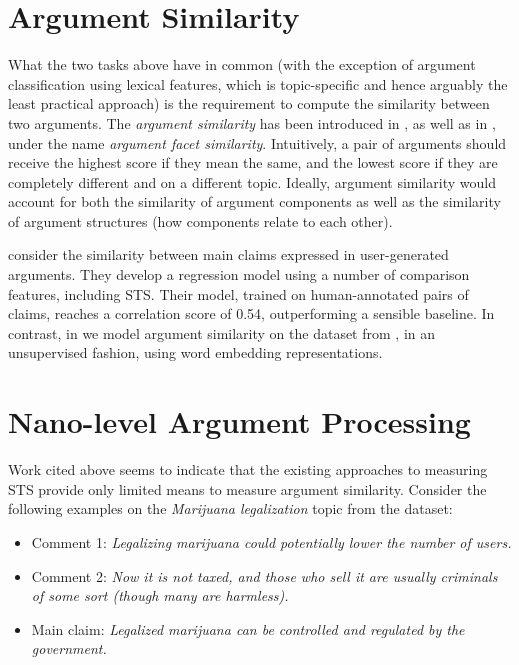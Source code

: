 \documentclass[11pt]{article}
\begin{document}
\section{Argument Similarity}

What the two tasks above have in common (with the exception of argument classification using
lexical features, which is topic-specific and hence arguably the least
practical approach) is the requirement to compute the similarity between two
arguments. The \emph{argument similarity} has been introduced in
\cite{boltuzic2015identifying}, as well as in
\cite{swanson2015argument,misra2015using}, under the name \emph{argument facet
similarity}. Intuitively, a pair of arguments should receive the highest score
if they mean the same, and the lowest score if they are completely
different and on a different topic. Ideally, argument similarity would account for 
both the similarity of argument components as well as the similarity of
argument structures (how components relate to each other). 

 consider the similarity between main claims expressed
in user-generated arguments. They develop a regression model using a number of
comparison features, including STS. Their model, trained on human-annotated
pairs of claims, reaches a correlation score of 0.54, outperforming a sensible
baseline. In contrast, in \cite{boltuzic2015identifying} we model argument
similarity on the dataset from \cite{hasan2014why}, in an unsupervised fashion,
using word embedding representations.

\section{Nano-level Argument Processing}

Work cited above seems to indicate that the existing approaches to measuring
STS provide only limited means to measure argument similarity. Consider the
following examples on the \emph{Marijuana legalization} topic from the
\cite{hasan2014why} dataset:

\begin{itemize}
\setlength\itemsep{0.1em}
\item Comment 1: \emph{Legalizing marijuana could potentially lower the number of users.}
\item Comment 2: \emph{Now it is not taxed, and those who sell it are usually criminals of some sort (though many are harmless).}
\item Main claim: \emph{Legalized marijuana can be controlled and regulated by the government.}
\end{itemize}
\end{document}
